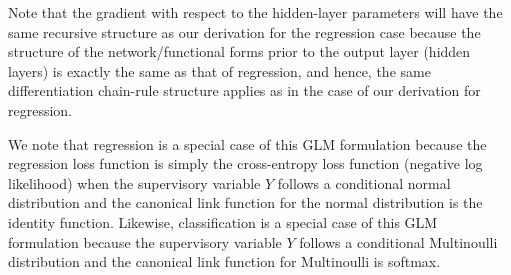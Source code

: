 \documentclass[10pt]{amsart}
\begin{document}
\begin{appendices}
Note that the gradient with respect to the hidden-layer parameters will have the same recursive structure as our derivation for the regression case because the structure of the network/functional forms prior to the output layer (hidden layers) is exactly the same as that of regression, and hence, the same differentiation chain-rule structure applies as in the case of our derivation for regression.

We note that regression is a special case of this GLM formulation because the regression loss function is simply the cross-entropy loss function (negative log likelihood) when the supervisory variable $Y$ follows a conditional normal distribution and the canonical link function for the normal distribution is the identity function. Likewise, classification is a special case of this GLM formulation because the supervisory variable $Y$ follows a conditional Multinoulli distribution and the canonical link function for Multinoulli is softmax.

\end{appendices}
\end{document}
